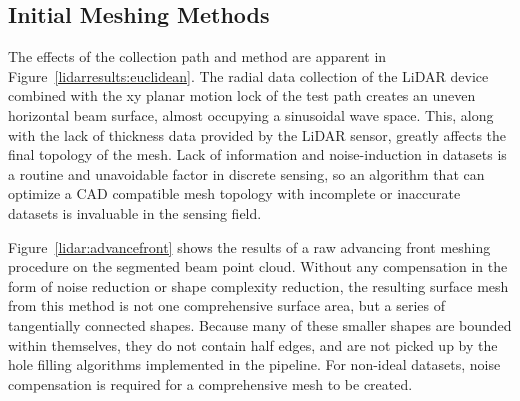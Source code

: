 \documentclass[12pt]{drexelthesis}
\let\Oldsubsection\subsection
\renewcommand{\subsection}{\FloatBarrier\Oldsubsection}
\begin{document}
\subsection{Initial Meshing Methods}

The effects of the collection path and method are apparent in Figure~\ref{lidarresults:euclidean}. The radial data collection of the LiDAR device combined with the xy planar motion lock of the test path creates an uneven horizontal beam surface, almost occupying a sinusoidal wave space. This, along with the lack of thickness data provided by the LiDAR sensor, greatly affects the final topology of the mesh. Lack of information and noise-induction in datasets is a routine and unavoidable factor in discrete sensing, so an algorithm that can optimize a CAD compatible mesh topology with incomplete or inaccurate datasets is invaluable in the sensing field.

Figure~\ref{lidar:advancefront} shows the results of a raw advancing front meshing procedure on the segmented beam point cloud. Without any compensation in the form of noise reduction or shape complexity reduction, the resulting surface mesh from this method is not one comprehensive surface area, but a series of tangentially connected shapes. Because many of these smaller shapes are bounded within themselves, they do not contain half edges, and are not picked up by the hole filling algorithms implemented in the pipeline. For non-ideal datasets, noise compensation is required for a comprehensive mesh to be created.
\end{document}
